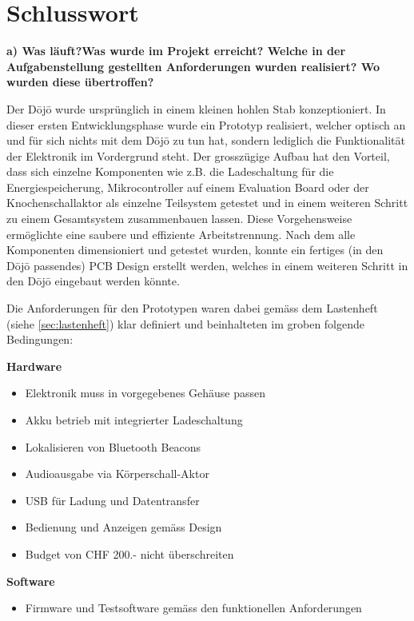 \section{Schlusswort} \label{sec:schlusswort}


\textbf{a) Was läuft?Was wurde im Projekt erreicht? Welche in der Aufgabenstellung gestellten Anforderungen wurden realisiert? Wo wurden diese übertroffen?}


Der Dōjō wurde ursprünglich in einem kleinen hohlen Stab konzeptioniert. In dieser ersten Entwicklungsphase wurde ein Prototyp realisiert, welcher optisch an und für sich nichts mit dem Dōjō zu tun hat, sondern lediglich die Funktionalität der Elektronik im Vordergrund steht. Der grosszügige Aufbau hat den Vorteil, dass sich einzelne Komponenten wie z.B. die Ladeschaltung für die Energiespeicherung, Mikrocontroller auf einem Evaluation Board oder der Knochenschallaktor als einzelne Teilsystem getestet und in einem weiteren Schritt zu einem Gesamtsystem zusammenbauen lassen. Diese Vorgehensweise ermöglichte eine saubere und effiziente Arbeitstrennung. Nach dem alle Komponenten dimensioniert und getestet wurden, konnte ein fertiges (in den Dōjō passendes) PCB Design erstellt werden, welches in einem weiteren Schritt in den Dōjō eingebaut werden könnte.
 
Die Anforderungen für den Prototypen waren dabei gemäss dem Lastenheft (siehe \ref{sec:lastenheft}) klar definiert und beinhalteten im groben folgende Bedingungen:
 
\textbf{Hardware}
\begin{itemize}
	\item Elektronik muss in vorgegebenes Gehäuse passen	\item Akku betrieb mit integrierter Ladeschaltung
	\item Lokalisieren von Bluetooth Beacons
	\item Audioausgabe via Körperschall-Aktor
	\item USB für Ladung und Datentransfer
	\item Bedienung und Anzeigen gemäss Design
	\item Budget von CHF 200.- nicht überschreiten 
\end{itemize}
 
\textbf{Software}
\begin{itemize}
	\item Firmware und Testsoftware gemäss den funktionellen Anforderungen
\end{itemize}
 
